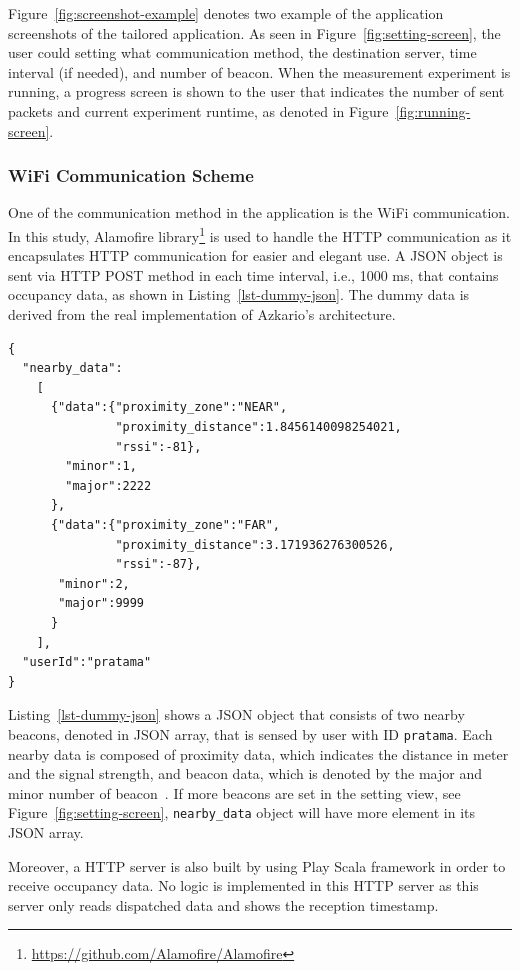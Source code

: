 \documentclass[journal]{vgtc}                %
\begin{document}
Figure~\ref{fig:screenshot-example} denotes two example of the application screenshots of the tailored application. As seen in Figure~\ref{fig:setting-screen}, the user could setting what communication method, the destination server, time interval (if needed), and number of beacon. When the measurement experiment is running, a progress screen is shown to the user that indicates the number of sent packets and current experiment runtime, as denoted in Figure~\ref{fig:running-screen}.

\subsubsection{WiFi Communication Scheme} %
\label{ssub:wifi_communication_scheme}
One of the communication method in the application is the WiFi communication. In this study, Alamofire library\footnote{\url{https://github.com/Alamofire/Alamofire}} is used to handle the HTTP communication as it encapsulates HTTP communication for easier and elegant use. A JSON object is sent via HTTP POST method in each time interval, i.e., 1000 ms, that contains occupancy data, as shown in Listing~\ref{lst-dummy-json}. The dummy data is derived from the real implementation of Azkario's architecture.

\begin{lstlisting}[caption=Example of dummy data in JSON., label=lst-dummy-json]
{
  "nearby_data":
    [
      {"data":{"proximity_zone":"NEAR",
               "proximity_distance":1.8456140098254021,
               "rssi":-81},
        "minor":1,
        "major":2222
      },
      {"data":{"proximity_zone":"FAR",
               "proximity_distance":3.171936276300526,
               "rssi":-87},
       "minor":2,
       "major":9999
      }
    ],
  "userId":"pratama"
}
\end{lstlisting}

Listing~\ref{lst-dummy-json} shows a JSON object that consists of two nearby beacons, denoted in JSON array, that is sensed by user with ID \texttt{pratama}. Each nearby data is composed of proximity data, which indicates the distance in meter and the signal strength, and beacon data, which is denoted by the major and minor number of beacon~\cite{AppleInc.2014}. If more beacons are set in the setting view, see Figure~\ref{fig:setting-screen}, \texttt{nearby\_data} object will have more element in its JSON array.

Moreover, a HTTP server is also built by using Play Scala framework in order to receive occupancy data. No logic is implemented in this HTTP server as this server only reads dispatched data and shows the reception timestamp.
\end{document}

